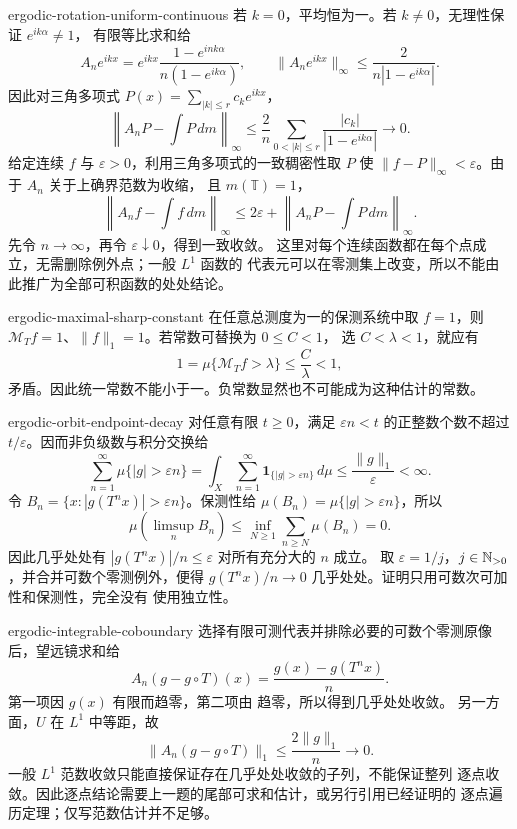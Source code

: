\begin{solution}{ergodic-rotation-uniform-continuous}
若 $k=0$，平均恒为一。若 $k\ne0$，无理性保证 $e^{ik\alpha}\ne1$，
有限等比求和给
\[
 A_ne^{ikx}
 =e^{ikx}\frac{1-e^{ink\alpha}}{n(1-e^{ik\alpha})},
 \qquad
 \|A_ne^{ikx}\|_\infty
 \le\frac2{n|1-e^{ik\alpha}|}.
\]
因此对三角多项式 $P(x)=\sum_{|k|\le r}c_ke^{ikx}$，
\[
 \left\|A_nP-\int P\,dm\right\|_\infty
 \le\frac2n\sum_{0<|k|\le r}\frac{|c_k|}{|1-e^{ik\alpha}|}
 \longrightarrow0.
\]
给定连续 $f$ 与 $\varepsilon>0$，利用三角多项式的一致稠密性取 $P$
使 $\|f-P\|_\infty<\varepsilon$。由于 $A_n$ 关于上确界范数为收缩，
且 $m(\mathbb T)=1$，
\[
 \left\|A_nf-\int f\,dm\right\|_\infty
 \le2\varepsilon+
       \left\|A_nP-\int P\,dm\right\|_\infty.
\]
先令 $n\to\infty$，再令 $\varepsilon\downarrow0$，得到一致收敛。
这里对每个连续函数都在每个点成立，无需删除例外点；一般 $L^1$ 函数的
代表元可以在零测集上改变，所以不能由此推广为全部可积函数的处处结论。
\end{solution}

\begin{solution}{ergodic-maximal-sharp-constant}
在任意总测度为一的保测系统中取 $f=1$，则
$\mathcal M_Tf=1$、$\|f\|_1=1$。若常数可替换为 $0\le C<1$，
选 $C<\lambda<1$，就应有
\[
 1=\mu\{\mathcal M_Tf>\lambda\}\le\frac C\lambda<1,
\]
矛盾。因此统一常数不能小于一。负常数显然也不可能成为这种估计的常数。
\end{solution}

\begin{solution}{ergodic-orbit-endpoint-decay}
对任意有限 $t\ge0$，满足 $\varepsilon n<t$ 的正整数个数不超过
$t/\varepsilon$。因而非负级数与积分交换给
\[
 \sum_{n=1}^\infty\mu\{|g|>\varepsilon n\}
 =\int_X\sum_{n=1}^\infty\mathbf1_{\{|g|>\varepsilon n\}}\,d\mu
 \le\frac{\|g\|_1}{\varepsilon}<\infty.
\]
令 $B_n=\{x:|g(T^nx)|>\varepsilon n\}$。保测性给
$\mu(B_n)=\mu\{|g|>\varepsilon n\}$，所以
\[
 \mu(\limsup_nB_n)
 \le\inf_{N\ge1}\sum_{n\ge N}\mu(B_n)=0.
\]
因此几乎处处有 $|g(T^nx)|/n\le\varepsilon$ 对所有充分大的 $n$ 成立。
取 $\varepsilon=1/j$，$j\in\mathbb{N}_{>0}$，并合并可数个零测例外，便得
$g(T^nx)/n\to0$ 几乎处处。证明只用可数次可加性和保测性，完全没有
使用独立性。
\end{solution}

\begin{solution}{ergodic-integrable-coboundary}
选择有限可测代表并排除必要的可数个零测原像后，望远镜求和给
\[
 A_n(g-g\circ T)(x)=\frac{g(x)-g(T^nx)}n.
\]
第一项因 $g(x)$ 有限而趋零，第二项由
趋零，所以得到几乎处处收敛。
另一方面，$U$ 在 $L^1$ 中等距，故
\[
 \|A_n(g-g\circ T)\|_1\le\frac{2\|g\|_1}{n}\longrightarrow0.
\]
一般 $L^1$ 范数收敛只能直接保证存在几乎处处收敛的子列，不能保证整列
逐点收敛。因此逐点结论需要上一题的尾部可求和估计，或另行引用已经证明的
逐点遍历定理；仅写范数估计并不足够。
\end{solution}

